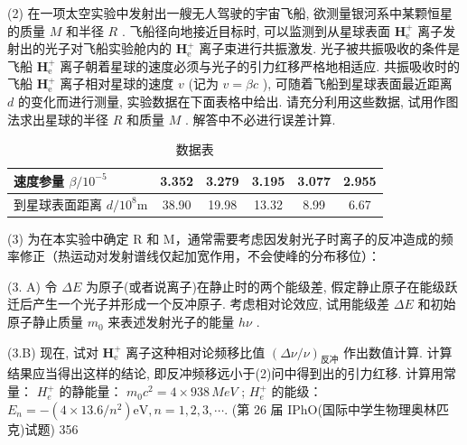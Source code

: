 (2) 在一项太空实验中发射出一艘无人驾驶的宇宙飞船, 欲测量银河系中某颗恒星的质量 $M$ 和半径 $R$ . 飞船径向地接近目标时, 可以监测到从星球表面 $\mathbf{H}_{\mathrm{e}}^{+}$ 离子发射出的光子对飞船实验舱内的 $\mathbf{H}_{\mathrm{e}}^{+}$ 离子束进行共振激发. 光子被共振吸收的条件是飞船 $\mathbf{H}_{\mathrm{e}}^{+}$ 离子朝着星球的速度必须与光子的引力红移严格地相适应. 共振吸收时的飞船 $\mathbf{H}_{\mathrm{e}}^{+}$ 离子相对星球的速度 $v$ (记为 $v = \beta c$ ), 可随着飞船到星球表面最近距离 $d$ 的变化而进行测量, 实验数据在下面表格中给出. 请充分利用这些数据, 试用作图法求出星球的半径 $R$ 和质量 $M$ . 解答中不必进行误差计算.

\begin{table}[htbp]
\centering
\caption{数据表}
\label{tab:data_grid}
\begin{tabular}{|l|c|c|c|c|c|}
\hline
速度参量 $\beta/10^{-5}$ & 3.352 & 3.279 & 3.195 & 3.077 & 2.955 \\ \hline
到星球表面距离 $d/10^{8}$m & 38.90 & 19.98 & 13.32 & 8.99 & 6.67 \\ \hline
\end{tabular}
\end{table}

(3) 为在本实验中确定 R 和 M，通常需要考虑因发射光子时离子的反冲造成的频率修正（热运动对发射谱线仅起加宽作用，不会使峰的分布移位）：

(3. A) 令 $\Delta E$ 为原子(或者说离子)在静止时的两个能级差, 假定静止原子在能级跃迁后产生一个光子并形成一个反冲原子. 考虑相对论效应, 试用能级差 $\Delta E$ 和初始原子静止质量 $m_0$ 来表述发射光子的能量 $h\nu$ .

(3.B) 现在, 试对 $\mathbf{H}_{\mathrm{e}}^{+}$ 离子这种相对论频移比值 $(\Delta \nu / \nu)_{\text{反冲}}$ 作出数值计算. 计算结果应当得出这样的结论, 即反冲频移远小于(2)问中得到出的引力红移.
计算用常量：
$H_{e}^{+}$ 的静能量： $m_{0}c^{2}=4\times938\,MeV$ ;
$H_{e}^{+}$ 的能级： $E_{n}=-(4\times13.6/n^{2})\mathrm{eV}, n=1,2,3,\cdots.$ 
(第 26 届 IPhO(国际中学生物理奥林匹克)试题)
356 
